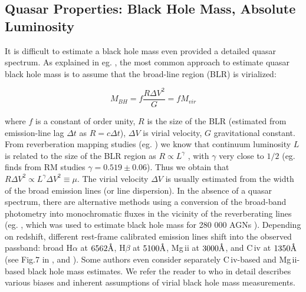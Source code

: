 \documentclass[twocolumn]{aastex62}
\let\oldAA\AA
\renewcommand{\AA}{\text{\normalfont\oldAA}}
\begin{document}
\subsection{Quasar Properties: Black Hole Mass, Absolute Luminosity}

It is difficult to estimate a black hole mass even provided a detailed quasar spectrum.  As explained in eg. \citet{shen2008}, the most common approach to estimate quasar black hole mass is to assume that the broad-line region (BLR) is virialized:


\begin{equation}
M_{BH} = f \frac{ R\Delta V^{2} }{G} = f M_{vir}
\end{equation}


where $f$ is a constant of order unity, $R$ is the size of the BLR (estimated from  emission-line lag $\Delta t$ as $R = c \Delta t$), $\Delta V$ is virial velocity, $G$ gravitational constant.  From reverberation mapping studies (eg. \citealt{shen2018}) we know that continuum luminosity $L$ is related to the size of the BLR region as $R \propto L^{\gamma}$ \citep{vestergaard2006}, with $\gamma$ very close to $1/2$ (eg. \citealt{bentz2009} finds from RM studies $\gamma = 0.519 \pm 0.06$). Thus we obtain  that $R \Delta V^{2} \propto L^{\gamma} \Delta V^{2} \equiv \mu$. The virial velocity $\Delta V$ is usually estimated from the width of the broad emission lines (or line dispersion).  In the absence of a quasar spectrum, there are alternative methods using a conversion of the broad-band photometry into monochromatic fluxes in the vicinity of the reverberating lines (eg. \citealt{kozlowski2015}, which was used to estimate black hole mass for 280 000 AGNs \citealt{kozlowski2017b}).   
Depending on redshift, different rest-frame calibrated emission lines shift into the observed passband: broad H$\alpha$ at  $6562\mbox{\AA}$, H$\beta$ at  $5100 \mbox{\AA}$, Mg\,{\sc ii} at $3000\mbox{\AA}$, and C\,{\sc iv} at $1350\mbox{\AA}$ (see Fig.7 in \citealt{shen2018}, and \citealt{vestergaard2002}). Some authors even consider separately C\,{\sc iv}-based and  Mg\,{\sc ii}-based  black hole mass estimates. We refer the reader to \citet{shen2008} who in detail describes various biases and inherent assumptions of virial black hole mass measurements. 
\end{document}

